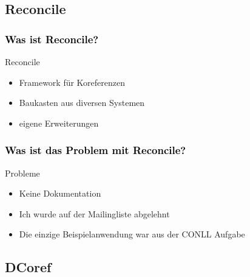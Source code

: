 \documentclass[xcolor=dvipsnames]{beamer}
\begin{document}

\subsection{Reconcile}

\begin{frame}\frametitle{\textcolor{black}{Was ist Reconcile?}}

\begin{block}{Reconcile}
\begin{itemize}
  \item Framework für Koreferenzen
  \item Baukasten aus diversen Systemen
  \item eigene Erweiterungen
\end{itemize}
\end{block}

\end{frame}

\begin{frame}\frametitle{\textcolor{black}{Was ist das Problem mit Reconcile?}}

\begin{block}{Probleme}
\begin{itemize}
  \item Keine Dokumentation
  \item Ich wurde auf der Mailingliste abgelehnt
  \item Die einzige Beispielanwendung war aus der CONLL Aufgabe
\end{itemize}
\end{block}

\end{frame}



\subsection{DCoref}
\end{document}
